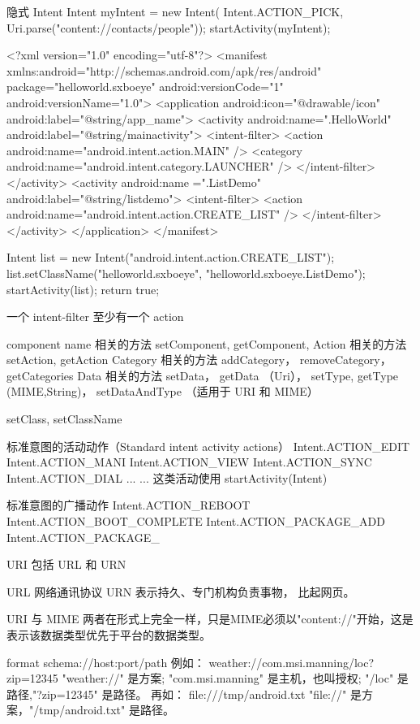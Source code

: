 \documentclass{book}
\begin{document}
\begin{CJK}{UTF8}{gbsn}
{隐式 Intent
Intent myIntent = new Intent( Intent.ACTION_PICK,
                              Uri.parse("content://contacts/people"));
startActivity(myIntent);


<?xml version="1.0" encoding="utf-8"?>
<manifest xmlns:android="http://schemas.android.com/apk/res/android"
      package="helloworld.sxboeye" android:versionCode="1" android:versionName="1.0">
    <application android:icon="@drawable/icon" android:label="@string/app_name">
        <activity android:name=".HelloWorld" android:label="@string/mainactivity">
            <intent-filter>
                <action android:name="android.intent.action.MAIN" />
                <category android:name="android.intent.category.LAUNCHER" />
            </intent-filter>
        </activity>
        <activity android:name =".ListDemo" android:label="@string/listdemo">
            <intent-filter>
                <action android:name="android.intent.action.CREATE_LIST" />
            </intent-filter>
        </activity>
    </application>
</manifest>

       Intent list = new Intent("android.intent.action.CREATE_LIST");
        list.setClassName("helloworld.sxboeye", "helloworld.sxboeye.ListDemo");
        startActivity(list);
        return true;



一个 intent-filter 至少有一个 action

component name 相关的方法 setComponent, getComponent, 
Action 相关的方法setAction, getAction
Category 相关的方法 addCategory， removeCategory， getCategories
Data   相关的方法 setData， getData （Uri）， setType, getType (MIME,String)，
                 setDataAndType （适用于 URI 和 MIME）

setClass, setClassName


标准意图的活动动作（Standard intent activity actions）
Intent.ACTION_EDIT
Intent.ACTION_MANI
Intent.ACTION_VIEW
Intent.ACTION_SYNC
Intent.ACTION_DIAL
... ...
这类活动使用 startActivity(Intent)

标准意图的广播动作
Intent.ACTION_REBOOT
Intent.ACTION_BOOT_COMPLETE
Intent.ACTION_PACKAGE_ADD
Intent.ACTION_PACKAGE_


URI 包括 URL 和 URN

URL   网络通讯协议
URN   表示持久、专门机构负责事物，  比起网页。

URI 与 MIME
两者在形式上完全一样，只是MIME必须以"content://"开始，这是表示该数据类型优先于平台的数据类型。

format
schema://host:port/path    
例如：  weather://com.msi.manning/loc?zip=12345
"weather://" 是方案; "com.msi.manning" 是主机，也叫授权; "/loc" 是路径,"?zip=12345"
是路径。
再如： file:///tmp/android.txt
"file://" 是方案，"/tmp/android.txt" 是路径。

}
\end{CJK}
\end{document}
